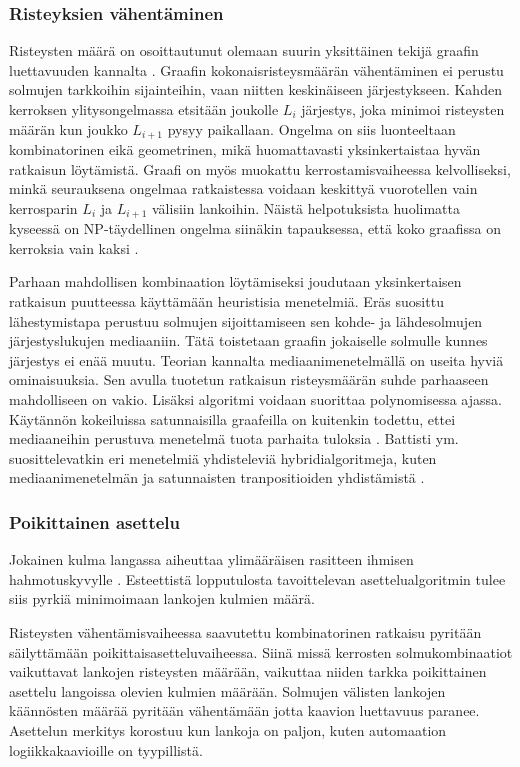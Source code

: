 \documentclass[finnish,12pt]{article}
\begin{document}
		\subsubsection{Risteyksien vähentäminen}

Risteysten määrä on osoittautunut olemaan suurin yksittäinen tekijä graafin luettavuuden kannalta \cite{RefWorks:47}. 
Graafin kokonaisristeysmäärän vähentäminen ei perustu solmujen tarkkoihin sijainteihin, vaan niitten keskinäiseen järjestykseen.
Kahden kerroksen ylitysongelmassa etsitään joukolle $L_i$ järjestys, joka minimoi risteysten määrän kun joukko $L_{i+1}$ pysyy paikallaan.
Ongelma on siis luonteeltaan kombinatorinen eikä geometrinen, mikä huomattavasti yksinkertaistaa hyvän ratkaisun löytämistä.
Graafi on myös muokattu kerrostamisvaiheessa kelvolliseksi, minkä seurauksena ongelmaa ratkaistessa voidaan keskittyä vuorotellen vain kerrosparin $L_i$ ja $L_{i+1}$ välisiin lankoihin.
Näistä helpotuksista huolimatta kyseessä on NP-täydellinen ongelma siinäkin tapauksessa, että koko graafissa on kerroksia vain kaksi \cite{RefWorks:40}.

Parhaan mahdollisen kombinaation löytämiseksi joudutaan yksinkertaisen ratkaisun puutteessa käyttämään heuristisia menetelmiä.
Eräs suosittu lähestymistapa perustuu solmujen sijoittamiseen sen kohde- ja lähdesolmujen järjestyslukujen mediaaniin.
Tätä toistetaan graafin jokaiselle solmulle kunnes järjestys ei enää muutu.
Teorian kannalta mediaanimenetelmällä on useita hyviä ominaisuuksia.
Sen avulla tuotetun ratkaisun risteysmäärän suhde parhaaseen mahdolliseen on vakio.
Lisäksi algoritmi voidaan suorittaa polynomisessa ajassa.
Käytännön kokeiluissa satunnaisilla graafeilla on kuitenkin todettu, ettei mediaaneihin perustuva menetelmä tuota parhaita tuloksia \cite{RefWorks:52}. 
Battisti ym. suosittelevatkin eri menetelmiä yhdisteleviä hybridialgoritmeja, kuten mediaanimenetelmän ja satunnaisten tranpositioiden yhdistämistä \cite{RefWorks:39}.

				\subsubsection{Poikittainen asettelu}
				
Jokainen kulma langassa aiheuttaa ylimääräisen rasitteen ihmisen hahmotuskyvylle \cite{RefWorks:47}. 
Esteettistä lopputulosta tavoittelevan asettelualgoritmin tulee siis pyrkiä minimoimaan lankojen kulmien määrä.

Risteysten vähentämisvaiheessa saavutettu kombinatorinen ratkaisu pyritään säilyttämään poikittaisasetteluvaiheessa.
Siinä missä kerrosten solmukombinaatiot vaikuttavat lankojen risteysten määrään, vaikuttaa niiden tarkka poikittainen asettelu langoissa olevien kulmien määrään.
Solmujen välisten lankojen käännösten määrää pyritään vähentämään jotta kaavion luettavuus paranee.
Asettelun merkitys korostuu kun lankoja on paljon, kuten automaation logiikkakaavioille on tyypillistä.
\end{document}
